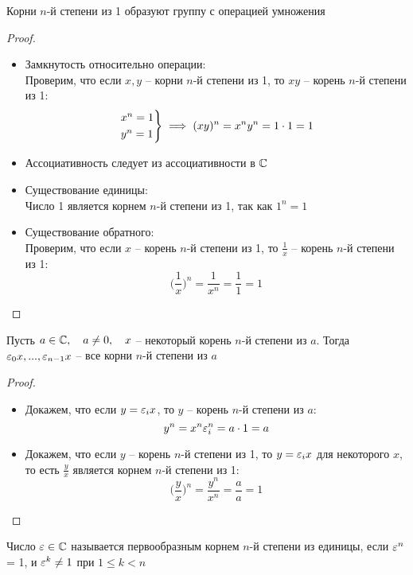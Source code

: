 \begin{props}
	\item Корни $n$-й степени из 1 образуют группу с операцией умножения
	\begin{proof}
		\hfill
		\begin{itemize}
			\item Замкнутость относительно операции: \\
			Проверим, что если $x, y$ -- корни $n$-й степени из 1, то $xy$ -- корень $n$-й степени из 1:
			$$ \begin{rcases}
			   	x^n = 1 \\
				y^n = 1
			   \end{rcases} \implies (xy)^n = x^ny^n = 1 \cdot 1 = 1 $$
			\item Ассоциативность следует из ассоциативности в $\mathbb{C}$
			\item Существование единицы: \\
			Число 1 является корнем $n$-й степени из 1, так как $1^n = 1$
			\item Существование обратного: \\
			Проверим, что если $x$ -- корень $n$-й степени из 1, то $\frac1x$ -- корень $n$-й степени из 1:
			$$ \bigg( \frac1x \bigg)^n = \frac1{x^n} = \frac11 = 1 $$
		\end{itemize}
	\end{proof}
	\item Пусть $a \in \mathbb{C}, \quad a \ne 0, \quad x$ -- некоторый корень $n$-й степени из $a$. Тогда $\varepsilon_0x, ..., \varepsilon_{n - 1}x$ -- все корни $n$-й степени из $a$
	\begin{proof}
		\hfill
		\begin{itemize}
			\item Докажем, что если $y = \varepsilon_ix$, то $y$ -- корень $n$-й степени из $a$:
			$$ y^n = x^n\varepsilon_i^n = a \cdot 1 = a $$
			\item Докажем, что если $y$ -- корень $n$-й степени из 1, то $y = \varepsilon_ix$ для некоторого $x$, то есть $\frac{y}x$ является корнем $n$-й степени из 1:
			$$ \bigg( \frac{y}x \bigg)^n = \frac{y^n}{x^n} = \frac{a}a = 1 $$
		\end{itemize}
	\end{proof}
\end{props}

\begin{definition}
	Число $\varepsilon \in \mathbb{C}$ называется первообразным корнем $n$-й степени из единицы, если $\varepsilon^n$ = 1, и $\varepsilon^k \ne 1$ при $1 \le k < n$
\end{definition}

